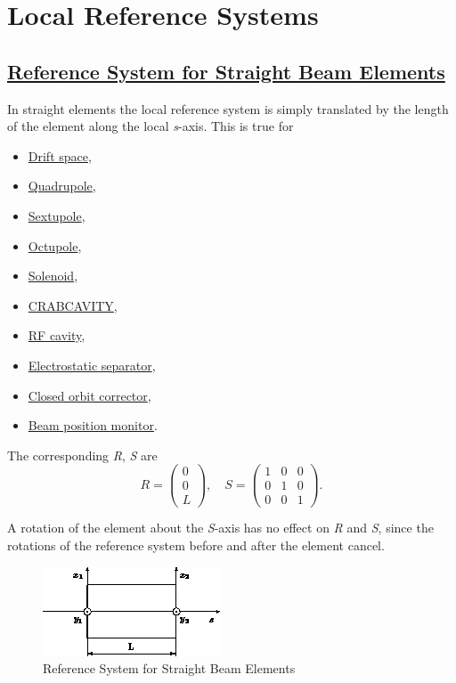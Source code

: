 
\section{Local Reference Systems}

\subsection{\href{straight}{Reference System for Straight Beam
    Elements}} 
In straight elements the local reference system is simply translated by
the length of the element along the local \textit{s}-axis. This is true
for  
\begin{itemize}
   \item \href{drift.html}{Drift space}, 
   \item \href{quadrupole.html}{Quadrupole}, 
   \item \href{sextupole.html}{Sextupole}, 
   \item \href{octupole.html}{Octupole}, 
   \item \href{solenoid.html}{Solenoid}, 
   \item \href{crabcavity.html}{CRABCAVITY}, 
   \item \href{cavity.html}{RF cavity}, 
   \item \href{separator.html}{Electrostatic separator}, 
   \item \href{kickers.html}{Closed orbit corrector}, 
   \item \href{monitors.html}{Beam position monitor}. 
\end{itemize} 

The corresponding \textit{R}, \textit{S} are 
\[
R =
 \begin{pmatrix}
  0 \\
  0 \\
  L
 \end{pmatrix}
, \quad
S =
 \begin{pmatrix}
  1 & 0 &  0 \\
  0 & 1 &  0 \\
  0 & 0 &  1
 \end{pmatrix}
.
\]

A rotation of the element about the \textit{S}-axis has no effect on
\textit{R} and \textit{S}, since the rotations of the reference system
before and after the element cancel.  
\begin{figure}[H]
  \centering
	\includegraphics{figures/ref_straight.png}
  \caption{Reference System for Straight Beam Elements}
\end{figure}


